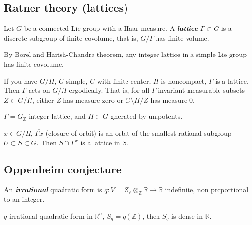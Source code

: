 \subsection{Ratner theory (lattices)}

\begin{defn}\leavevmode
	Let $G$ be a connected Lie group with a Haar measure. A \textit{\textbf{lattice}} $\Gamma \subset G$ is a discrete subgroup of finite covolume, that is, $G/\Gamma$ has finite volume.
\end{defn}

\begin{example}\leavevmode
	By Borel and Harish-Chandra theorem, any integer lattice in a simple Lie group has finite covolume.
\end{example}

\begin{thm}[Moore]\leavevmode
	If you have $G/H$, $G$ simple, $G$ with finite center, $H$ is noncompact, $\Gamma$ is a lattice. Then $\Gamma$ acts on $G/H$ ergodically. That is, for all $\Gamma$-invariant measurable subsets $Z \subset G/H$, either $Z$ has measure zero or  $G\setminus H/Z$ has measure 0.
\end{thm} 

\begin{thm}[Ratner]\leavevmode	
$\Gamma=G_\mathbb{Z}$ integer lattice, and $H \subset G$ gnerated by unipotents.

$x\in G/H$, $\overline{\Gamma x}$ (closure of orbit) is an orbit of the smallest rational subgroup $U\subset S\subset G$. Then $S\cap \Gamma^x$ is a lattice in $S$.
\end{thm}

\subsection{Oppenheim conjecture}

\begin{defn}\leavevmode
	An \textit{\textbf{irrational}} quadratic form is  $q:V=Z_\mathbb{Z}\otimes_\mathbb{Z}\mathbb{R}\longrightarrow \mathbb{R}$ indefinite, non proportional to an integer.
\end{defn}

\begin{conjecture} $q$ irrational quadratic form in $\mathbb{R}^{n}$, $S_q=q(\mathbb{Z})$, then $S_q$ is dense in $\mathbb{R}$.
\end{conjecture}

